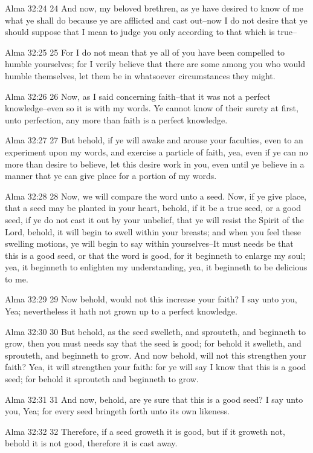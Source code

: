 Alma 32:24
 24 And now, my beloved brethren, as ye have desired to know of
me what ye shall do because ye are afflicted and cast out--now I
do not desire that ye should suppose that I mean to judge you
only according to that which is true--

Alma 32:25
 25 For I do not mean that ye all of you have been compelled to
humble yourselves; for I verily believe that there are some among
you who would humble themselves, let them be in whatsoever
circumstances they might.

Alma 32:26
 26 Now, as I said concerning faith--that it was not a perfect
knowledge--even so it is with my words. Ye cannot know of their
surety at first, unto perfection, any more than faith is a
perfect knowledge.

Alma 32:27
 27 But behold, if ye will awake and arouse your faculties, even
to an experiment upon my words, and exercise a particle of faith,
yea, even if ye can no more than desire to believe, let this
desire work in you, even until ye believe in a manner that ye can
give place for a portion of my words.

Alma 32:28
 28 Now, we will compare the word unto a seed. Now, if ye give
place, that a seed may be planted in your heart, behold, if it be
a true seed, or a good seed, if ye do not cast it out by your
unbelief, that ye will resist the Spirit of the Lord, behold, it
will begin to swell within your breasts; and when you feel these
swelling motions, ye will begin to say within yourselves--It must
needs be that this is a good seed, or that the word is good, for
it beginneth to enlarge my soul; yea, it beginneth to enlighten
my understanding, yea, it beginneth to be delicious to me.

Alma 32:29
 29 Now behold, would not this increase your faith? I say unto
you, Yea; nevertheless it hath not grown up to a perfect
knowledge.

Alma 32:30
 30 But behold, as the seed swelleth, and sprouteth, and
beginneth to grow, then you must needs say that the seed is good;
for behold it swelleth, and sprouteth, and beginneth to grow.
And now behold, will not this strengthen your faith? Yea, it
will strengthen your faith: for ye will say I know that this is a
good seed; for behold it sprouteth and beginneth to grow.

Alma 32:31
 31 And now, behold, are ye sure that this is a good seed? I say
unto you, Yea; for every seed bringeth forth unto its own
likeness.

Alma 32:32
 32 Therefore, if a seed groweth it is good, but if it groweth
not, behold it is not good, therefore it is cast away.

